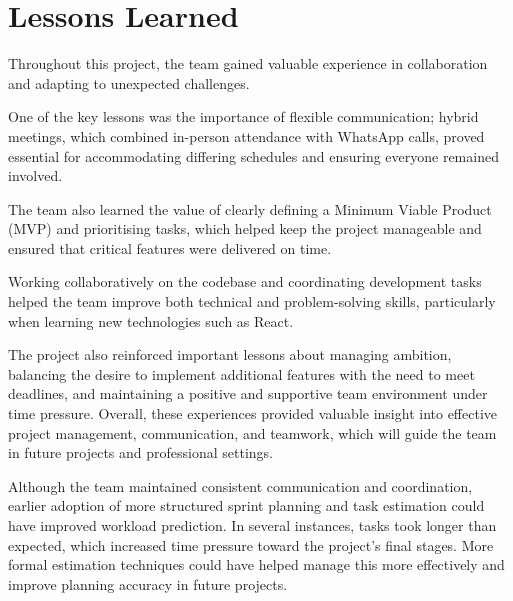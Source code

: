 \section{Lessons Learned}
Throughout this project, the team gained valuable experience in collaboration and adapting to unexpected challenges.

One of the key lessons was the importance of flexible communication; hybrid meetings, which combined in-person attendance with WhatsApp calls, proved essential for accommodating differing schedules and ensuring everyone remained involved.

The team also learned the value of clearly defining a Minimum Viable Product (MVP) and prioritising tasks, which helped keep the project manageable and ensured that critical features were delivered on time.

Working collaboratively on the codebase and coordinating development tasks helped the team improve both technical and problem-solving skills, particularly when learning new technologies such as React.

The project also reinforced important lessons about managing ambition, balancing the desire to implement additional features with the need to meet deadlines, and maintaining a positive and supportive team environment under time pressure. Overall, these experiences provided valuable insight into effective project management, communication, and teamwork, which will guide the team in future projects and professional settings.

Although the team maintained consistent communication and coordination, earlier adoption of more structured sprint planning and task estimation could have improved workload prediction. In several instances, tasks took longer than expected, which increased time pressure toward the project's final stages. More formal estimation techniques could have helped manage this more effectively and improve planning accuracy in future projects.